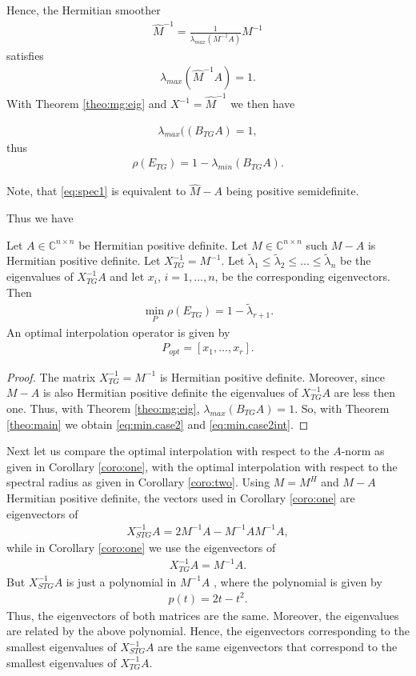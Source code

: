 \documentclass[final]{siamltex}
\newcommand{\beqo}{\begin{eqnarray*}}
\newcommand{\beq}{\begin{eqnarray}}
\newcommand{\eeqo}{\end{eqnarray*}}
\newcommand{\eeq}{\end{eqnarray}}
\numberwithin{equation}{section}
\newcommand{\inCnn}{\in \mathbb{C}^{n \times n}}
\begin{document}
Hence, the  Hermitian smoother
\beqo
\hat M^{-1} = \frac{1}{\lambda_{max}(M^{-1}A)}M^{-1}
\eeqo
satisfies
\beq \label{eq:spec1}
\lambda_{max}(\hat M^{-1}A) = 1.
\eeq
With Theorem \ref{theo:mg:eig} and $X^{-1} = \hat M^{-1}$ we then have 

\beqo
\lambda_{max} ((B_{TG}A) = 1,
\eeqo
thus
\beqo
\rho(E_{TG}) = 1 - \lambda_{min } (B_{TG}A).
\eeqo

Note, that \eqref{eq:spec1} is equivalent to  $\hat M - A $ being positive semidefinite.

Thus we  have 






\begin{corollary} \label{coro:two}
Let  $A\inCnn$  be Hermitian positive definite. Let $ M \inCnn$ such $M - A$ is Hermitian positive definite. 
Let $X_{TG}^{-1} =  M^{-1}$.   
 Let $
\tilde \lambda_1 \leq \tilde \lambda_2 \leq \ldots \leq  \tilde \lambda_n $
be the  eigenvalues of $X_{TG}^{-1}A$  and let $x_i$, $i = 1, \ldots, n$, be the corresponding eigenvectors. Then 
\beq \label{eq:min.case2}
\min_{P}\rho(E_{TG}) = 1 - \tilde \lambda_{r+1}.
\eeq
An optimal interpolation operator is given by 
\beq  \label{eq:min.case2int}
P_{opt} = [x_{1}, \ldots , x_r].
\eeq
\end{corollary}
\begin{proof}
The matrix $X_{TG}^{-1} = M^{-1}$ is Hermitian positive definite. Moreover, since $M - A$ is also Hermitian positive definite the eigenvalues of 
$X_{TG}^{-1}A$ are less then  one. Thus, with Theorem \ref{theo:mg:eig}, $\lambda_{max}(B_{TG}A) = 1$.  So, with  Theorem \ref{theo:main}  we obtain \eqref{eq:min.case2} and \eqref{eq:min.case2int}.
\end{proof}

Next let us compare the optimal interpolation with respect to the $A$-norm as given in Corollary \ref{coro:one}, with  the optimal interpolation with respect to the spectral radius as given in Corollary \ref{coro:two}. Using $M=M^H$ and $M - A$ Hermitian positive definite, the vectors used in  Corollary \ref{coro:one}
are  eigenvectors of
\beqo
X^{-1}_{STG}A = 2M^{-1}A - M^{-1}AM^{-1}A,
\eeqo
while in Corollary \ref{coro:one} we use  the eigenvectors of
\beqo
X^{-1}_{TG}A = M^{-1}A.
\eeqo
But $X^{-1}_{STG}A$ is just a polynomial in $M^{-1}A$ , where   the polynomial is given by
\beq \label{eq:pol}
p(t) = 2t - t^2.
\eeq
Thus, the eigenvectors of both matrices are the same. Moreover, the   eigenvalues are  related
by   the above polynomial. Hence, the eigenvectors corresponding  to the smallest eigenvalues of
$X^{-1}_{STG}A$  are the same   eigenvectors that correspond to the smallest eigenvalues of $X^{-1}_{TG}A$.
\end{document}
